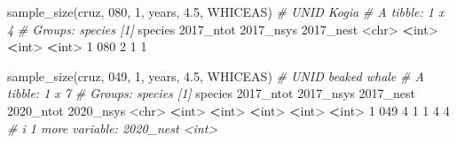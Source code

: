 \documentclass[
]{book}
\newenvironment{Shaded}{\begin{snugshade}}{\end{snugshade}}
\newcommand{\AttributeTok}[1]{\textcolor[rgb]{0.77,0.63,0.00}{#1}}
\newcommand{\CommentTok}[1]{\textcolor[rgb]{0.56,0.35,0.01}{\textit{#1}}}
\newcommand{\DecValTok}[1]{\textcolor[rgb]{0.00,0.00,0.81}{#1}}
\newcommand{\ErrorTok}[1]{\textcolor[rgb]{0.64,0.00,0.00}{\textbf{#1}}}
\newcommand{\FloatTok}[1]{\textcolor[rgb]{0.00,0.00,0.81}{#1}}
\newcommand{\FunctionTok}[1]{\textcolor[rgb]{0.00,0.00,0.00}{#1}}
\newcommand{\NormalTok}[1]{#1}
\newcommand{\SpecialCharTok}[1]{\textcolor[rgb]{0.00,0.00,0.00}{#1}}
\newcommand{\StringTok}[1]{\textcolor[rgb]{0.31,0.60,0.02}{#1}}
\begin{document}
\begin{Shaded}
\begin{Highlighting}[]
\FunctionTok{sample\_size}\NormalTok{(cruz, }\StringTok{\textquotesingle{}080\textquotesingle{}}\NormalTok{, }\DecValTok{1}\NormalTok{, years, }\FloatTok{4.5}\NormalTok{, }\StringTok{\textquotesingle{}WHICEAS\textquotesingle{}}\NormalTok{) }\CommentTok{\# UNID Kogia}
\CommentTok{\# A tibble: 1 x 4}
\CommentTok{\# Groups:   species [1]}
\NormalTok{  species }\StringTok{\textasciigrave{}}\AttributeTok{2017\_ntot}\StringTok{\textasciigrave{}} \StringTok{\textasciigrave{}}\AttributeTok{2017\_nsys}\StringTok{\textasciigrave{}} \StringTok{\textasciigrave{}}\AttributeTok{2017\_nest}\StringTok{\textasciigrave{}}
  \SpecialCharTok{\textless{}}\NormalTok{chr}\SpecialCharTok{\textgreater{}}         \ErrorTok{\textless{}}\NormalTok{int}\SpecialCharTok{\textgreater{}}       \ErrorTok{\textless{}}\NormalTok{int}\SpecialCharTok{\textgreater{}}       \ErrorTok{\textless{}}\NormalTok{int}\SpecialCharTok{\textgreater{}}
\DecValTok{1} \DecValTok{080}               \DecValTok{2}           \DecValTok{1}           \DecValTok{1}

\FunctionTok{sample\_size}\NormalTok{(cruz, }\StringTok{\textquotesingle{}049\textquotesingle{}}\NormalTok{, }\DecValTok{1}\NormalTok{, years, }\FloatTok{4.5}\NormalTok{, }\StringTok{\textquotesingle{}WHICEAS\textquotesingle{}}\NormalTok{) }\CommentTok{\# UNID beaked whale}
\CommentTok{\# A tibble: 1 x 7}
\CommentTok{\# Groups:   species [1]}
\NormalTok{  species }\StringTok{\textasciigrave{}}\AttributeTok{2017\_ntot}\StringTok{\textasciigrave{}} \StringTok{\textasciigrave{}}\AttributeTok{2017\_nsys}\StringTok{\textasciigrave{}} \StringTok{\textasciigrave{}}\AttributeTok{2017\_nest}\StringTok{\textasciigrave{}} \StringTok{\textasciigrave{}}\AttributeTok{2020\_ntot}\StringTok{\textasciigrave{}} \StringTok{\textasciigrave{}}\AttributeTok{2020\_nsys}\StringTok{\textasciigrave{}}
  \SpecialCharTok{\textless{}}\NormalTok{chr}\SpecialCharTok{\textgreater{}}         \ErrorTok{\textless{}}\NormalTok{int}\SpecialCharTok{\textgreater{}}       \ErrorTok{\textless{}}\NormalTok{int}\SpecialCharTok{\textgreater{}}       \ErrorTok{\textless{}}\NormalTok{int}\SpecialCharTok{\textgreater{}}       \ErrorTok{\textless{}}\NormalTok{int}\SpecialCharTok{\textgreater{}}       \ErrorTok{\textless{}}\NormalTok{int}\SpecialCharTok{\textgreater{}}
\DecValTok{1} \DecValTok{049}               \DecValTok{4}           \DecValTok{1}           \DecValTok{1}           \DecValTok{4}           \DecValTok{4}
\CommentTok{\# i 1 more variable: \textasciigrave{}2020\_nest\textasciigrave{} \textless{}int\textgreater{}}


\end{Highlighting}
\end{Shaded}
\end{document}
